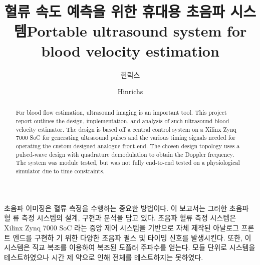 \documentclass[master,english,final]{kaist-ucs}
\title[korean] {혈류 속도 예측을 위한 휴대용 초음파 시스템}
\title[english]{Portable ultrasound system for blood velocity estimation}
\author[korean] {힌릭스}{예페}
\author[english]{Hinrichs}{Jeppe}
\begin{document}

   \thesisinfo
    \begin{summary}
	초음파 이미징은 혈류 측정을 수행하는 중요한 방법이다. 이 보고서는 그러한 초음파 혈 류 측정 시스템의 설계, 구현과 분석을 담고 있다. 초음파 혈류 측정 시스템은 Xilinx Zynq	7000 SoC 라는 중앙 제어 시스템을 기반으로 자체 제작된 아날로그 프론트 엔드를 구현하	기 위한 다양한 초음파 펄스 및 타이밍 신호를 발생시킨다. 또한, 이 시스템은 직교 복조를 이용하여 복조된 도플러 주파수를 얻는다. 모듈 단위로 시스템을 테스트하였으나 시간 제 약으로 인해 전체를 테스트하지는 못하였다.
    \end{summary}



    \begin{abstract}
    For blood flow estimation, ultrasound imaging is an important tool. This project report outlines the design, implementation, and analysis of such ultrasound blood velocity estimator. The design is based off a central control system on a Xilinx Zynq 7000 SoC for generating ultrasound pulses and the various timing signals needed for operating the custom designed analogue front-end. The chosen design topology uses a pulsed-wave design with quadrature demodulation to obtain the Doppler frequency. The system was module tested, but was not fully end-to-end tested on a physiological simulator due to time constraints.
    \end{abstract}



    \addtocounter{pagemarker}{1}                 %
    \newpage
\end{document}
